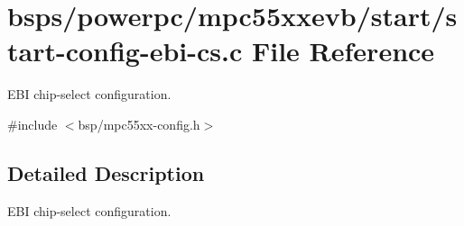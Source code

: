 \hypertarget{start-config-ebi-cs_8c}{}\section{bsps/powerpc/mpc55xxevb/start/start-\/config-\/ebi-\/cs.c File Reference}
\label{start-config-ebi-cs_8c}


E\+BI chip-\/select configuration.  


{\ttfamily \#include $<$bsp/mpc55xx-\/config.\+h$>$}\newline


\subsection{Detailed Description}
E\+BI chip-\/select configuration. 

